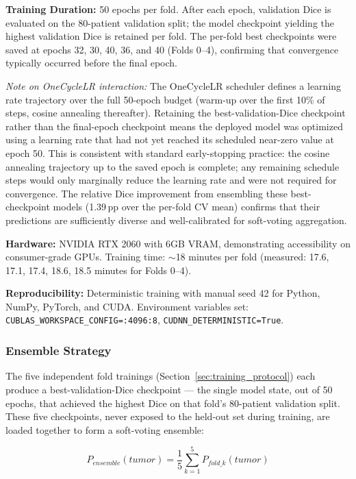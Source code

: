 \documentclass{article}
\begin{document}
\textbf{Training Duration:} 50 epochs per fold. After each epoch, validation Dice is evaluated on the 80-patient validation split; the model checkpoint yielding the highest validation Dice is retained per fold. The per-fold best checkpoints were saved at epochs 32, 30, 40, 36, and 40 (Folds 0--4), confirming that convergence typically occurred before the final epoch.

\textit{Note on OneCycleLR interaction:} The OneCycleLR scheduler defines a learning rate trajectory over the full 50-epoch budget (warm-up over the first 10\% of steps, cosine annealing thereafter). Retaining the best-validation-Dice checkpoint rather than the final-epoch checkpoint means the deployed model was optimized using a learning rate that had not yet reached its scheduled near-zero value at epoch 50. This is consistent with standard early-stopping practice: the cosine annealing trajectory up to the saved epoch is complete; any remaining schedule steps would only marginally reduce the learning rate and were not required for convergence. The relative Dice improvement from ensembling these best-checkpoint models (1.39\,pp over the per-fold CV mean) confirms that their predictions are sufficiently diverse and well-calibrated for soft-voting aggregation.

\textbf{Hardware:} NVIDIA RTX 2060 with 6GB VRAM, demonstrating accessibility on consumer-grade GPUs. Training time: $\sim$18 minutes per fold (measured: 17.6, 17.1, 17.4, 18.6, 18.5 minutes for Folds 0--4).

\textbf{Reproducibility:} Deterministic training with manual seed 42 for Python, NumPy, PyTorch, and CUDA. Environment variables set: \texttt{CUBLAS\_WORKSPACE\_CONFIG=:4096:8}, \texttt{CUDNN\_DETERMINISTIC=True}.

\subsubsection{Ensemble Strategy}

The five independent fold trainings (Section~\ref{sec:training_protocol}) each produce a best-validation-Dice checkpoint — the single model state, out of 50 epochs, that achieved the highest Dice on that fold's 80-patient validation split. These five checkpoints, never exposed to the held-out set during training, are loaded together to form a soft-voting ensemble:

\begin{equation}
P_{ensemble}(tumor) = \frac{1}{5} \sum_{k=1}^{5} P_{fold\_k}(tumor)
\end{equation}
\end{document}
